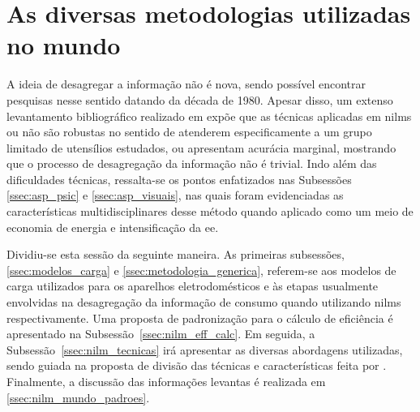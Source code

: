 \section{As diversas metodologias utilizadas no mundo}
\label{sec:nilm_mundo}

A ideia de desagregar a informação não é nova, sendo possível
encontrar pesquisas nesse sentido datando da década de 1980. Apesar
disso, um extenso levantamento bibliográfico
\cite{nilm_hart_1992_8,nilm_bouloutas_viterbi_ext_1991_11,
nilm_hart_fsm_viterbi_1993_12,nilm_norford_leeb_medianfilt_1996_13,
nilm_cole_data_extraction_1998_14,nilm_cole_extra_info_surge_1998_15,
nilm_powers_15minsamp_1991_16,nilm_farinaccio_16ssamp_1999_17,
nilm_marceau_16ssamp_improved_1999_18,nilm_baranski_genetic_base_2003_19,
nilm_baranski_genetic_detalhado_2004_20,nilm_baranski_summary_2004_21,
nilm_matthews_overview_2008_22,nilm_laughman_continuous_variables_2003_9,
nilm_leeb_spectral_envelope_1995_23,nilm_lee_variable_speed_estimation_2005_24,
nilm_wichakool_2009_25,nilm_shaw_2008_26,nilm_srinivasan_nn_2006_27,
nilm_akbar_2007_28,nilm_patel_2007_29,nilm_gupta_patel_2010_30,
nilm_sultanem_1991_10,nilm_chan_2000_31,nilm_lee_2004_32,nilm_lam_2007_33,
nilm_liang_pt1_2010_34,nilm_suzuki_2011_35,nilm_berges_2008_7,
nilm_berges_2009_36,2010_nilm_melhorando_pph_usa_37,
nilm_liang_pt2_2010_40} realizado em \cite{nilm_zeifman_review_2011}
expõe que as técnicas aplicadas em \glspl{nilm} ou não são robustas no
sentido de atenderem especificamente a um grupo limitado de utensílios
estudados, ou apresentam acurácia marginal, mostrando que o processo
de desagregação da informação não é trivial. Indo além das
dificuldades técnicas, ressalta-se os pontos enfatizados nas
Subsessões \ref{ssec:asp_psic} e \ref{ssec:asp_visuais}, nas quais
foram evidenciadas as características multidisciplinares desse método
quando aplicado como um meio de economia de energia e intensificação
da \gls{ee}.

Dividiu-se esta sessão da seguinte maneira. As primeiras subsessões,
\ref{ssec:modelos_carga} e \ref{ssec:metodologia_generica}, referem-se
aos modelos de carga utilizados para os aparelhos eletrodomésticos e às
etapas usualmente envolvidas na desagregação da informação de
consumo quando utilizando \glspl{nilm} respectivamente. Uma
proposta de padronização para o cálculo de eficiência é apresentado na
Subsessão~\ref{ssec:nilm_eff_calc}. Em seguida, a
Subsessão~\ref{ssec:nilm_tecnicas} irá apresentar as diversas
abordagens utilizadas, sendo guiada na proposta de divisão das
técnicas e características feita por \cite{nilm_zeifman_review_2011}.
Finalmente, a discussão das informações levantas é realizada em
\ref{ssec:nilm_mundo_padroes}.

